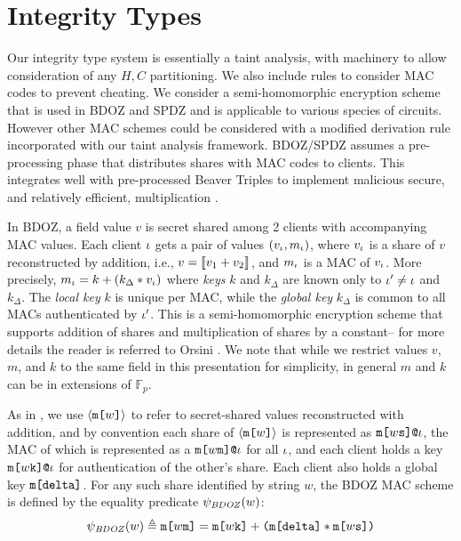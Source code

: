 \section{Integrity Types}
\label{section-ipj}

Our integrity type system is essentially a taint analysis, with
machinery to allow consideration of any $H,C$ partitioning.  We also
include rules to consider MAC codes to prevent cheating. We consider a
semi-homomorphic encryption scheme that is used in BDOZ and SPDZ
\cite{SPDZ1,SPDZ2,BDOZ,10.1007/978-3-030-68869-1_3} and is applicable
to various species of circuits. However other MAC schemes could be
considered with a modified derivation rule incorporated with our taint
analysis framework. BDOZ/SPDZ assumes a pre-processing phase that
distributes shares with MAC codes to clients.  This integrates well
with pre-processed Beaver Triples to implement malicious secure, and
relatively efficient, multiplication \cite{evans2018pragmatic}.

In BDOZ, a field value $v$ is secret shared among 2 clients 
with accompanying MAC values.  Each client $\iota$ gets a pair of
values $(v_\iota,m_\iota)$, where $v_\iota$ is a share of $v$
reconstructed by addition, i.e., $v = \llbracket v_1 + v_2 \rrbracket_{}$, and
$m_\iota$ is a MAC of $v_\iota$.  More precisely, $m_\iota = k +
(k_\Delta * v_\iota)$ where \emph{keys} $k$ and $k_\Delta$ are known
only to $\iota' \ne \iota$ and $k_\Delta$. The \emph{local key} $k$ is
unique per MAC, while the \emph{global key} $k_\Delta$ is common to
all MACs authenticated by $\iota'$. This is a semi-homomorphic
encryption scheme that supports addition of shares and multiplication
of shares by a constant-- for more details the reader is referred to
Orsini \cite{10.1007/978-3-030-68869-1_3}. We note that while we
restrict values $v$, $m$, and $k$ to the same field in this
presentation for simplicity, in general $m$ and $k$ can be in
extensions of $\mathbb{F}_p$.

\ipjfig

As in \cite{skalka-near-ppdp24}, we use $\langle \texttt{m[}w\texttt{]} \rangle$ to refer to
secret-shared values reconstructed with addition, and by
convention each share of $\langle \texttt{m[}w\texttt{]} \rangle$ is represented as
$\texttt{m[}w\texttt{s}\texttt{]}\texttt{@}\iota$, the MAC of which is represented as a
$\texttt{m[}w\texttt{m}\texttt{]}\texttt{@}\iota$ for all $\iota$, and each client holds a
key $\texttt{m[}w\texttt{k}\texttt{]}\texttt{@}\iota$ for authentication of the other's
share. Each client also holds a global key $\texttt{m[}\texttt{delta}\texttt{]}$. For
any such share identified by string $w$, the BDOZ MAC scheme is defined 
by the equality predicate $\psi_{\mathit{BDOZ}}(w)$:
$$
\psi_{\mathit{BDOZ}}(w) \triangleq
\texttt{m[}w\texttt{m}\texttt{]} = \texttt{m[}w\texttt{k}\texttt{]} + \texttt{(}\texttt{m[}\texttt{delta}\texttt{]} *
\texttt{m[}w\texttt{s}\texttt{]}\texttt{)}
$$

